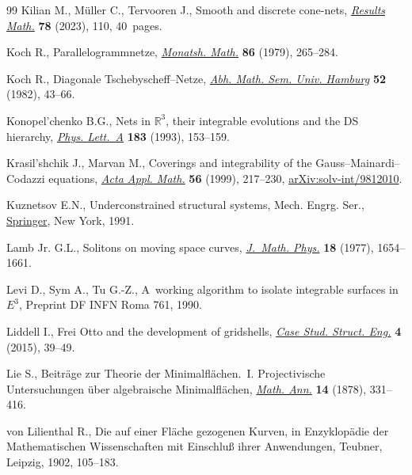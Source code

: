 \documentclass[pdftex]{sigma}
\numberwithin{equation}{section}
\begin{document}
\begin{thebibliography}{99}
Kilian M., M\"uller C., Tervooren J., Smooth and discrete cone-nets,
  \href{https://doi.org/10.1007/s00025-023-01884-9}{\textit{Results Math.}} \textbf{78} (2023), 110, 40~pages.

Koch R., Parallelogrammnetze, \href{https://doi.org/10.1007/BF01300243}{\textit{Monatsh. Math.}} \textbf{86} (1979),
  265--284.

Koch R., Diagonale {T}schebyscheff--{N}etze, \href{https://doi.org/10.1007/BF02941865}{\textit{Abh. Math. Sem. Univ.
  Hamburg}} \textbf{52} (1982), 43--66.

Konopel'chenko B.G., Nets in {$\mathbb{R}^3$}, their integrable evolutions and
  the {DS} hierarchy, \href{https://doi.org/10.1016/0375-9601(93)91162-X}{\textit{Phys. Lett.~A}} \textbf{183} (1993), 153--159.

Krasil'shchik J., Marvan M., Coverings and integrability of the
  {G}auss--{M}ainardi--{C}odazzi equations, \href{https://doi.org/10.1023/A:1006121716159}{\textit{Acta Appl. Math.}}
  \textbf{56} (1999), 217--230, \href{https://arxiv.org/abs/solv-int/9812010}{arXiv:solv-int/9812010}.

Kuznetsov E.N., Underconstrained structural systems, Mech. Engrg. Ser.,
  \href{https://doi.org/10.1007/978-1-4612-3176-9}{Springer}, New York, 1991.

Lamb Jr. G.L., Solitons on moving space curves, \href{https://doi.org/10.1063/1.523453}{\textit{J.~Math. Phys.}}
  \textbf{18} (1977), 1654--1661.

Levi D., Sym A., Tu G.-Z., A~working algorithm to isolate integrable surfaces in~$E^3$, {P}reprint DF INFN Roma 761, 1990.

Liddell I., Frei {O}tto and the development of gridshells, \href{https://doi.org/10.1016/j.csse.2015.08.001}{\textit{Case Stud.
  Struct. Eng.}} \textbf{4} (2015), 39--49.

Lie S., Beitr\"age zur {T}heorie der {M}inimalfl\"achen.~{I}. {P}rojectivische {U}ntersuchungen \"uber algebraische {M}inimalfl\"achen, \href{https://doi.org/10.1007/BF01677141}{\textit{Math. Ann.}} \textbf{14} (1878), 331--416.

von Lilienthal R., Die auf einer Fl\"ache gezogenen Kurven, in Enzyklop\"adie
  der Mathematischen Wissenschaften mit Einschlu{\ss} ihrer Anwendungen,
  Teubner, Leipzig, 1902, 105--183.


\end{thebibliography}
\end{document}
